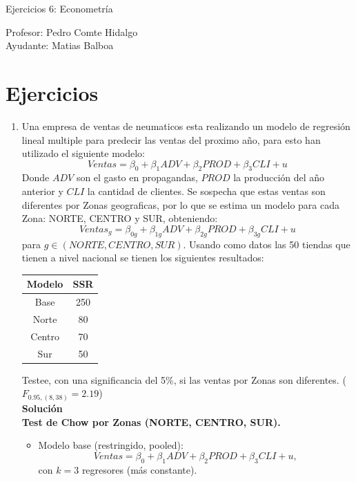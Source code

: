 \documentclass[10pt,a4paper]{article}
\begin{document}
\vspace{5cm}

\begin{center}
    {\Large  Ejercicios 6: Econometría }

Profesor:    Pedro Comte Hidalgo \\
Ayudante: Matias Balboa
\end{center}



\section{Ejercicios}
\begin{enumerate}


\item Una empresa de ventas de neumaticos esta realizando un modelo de regresión lineal multiple para predecir las ventas del proximo año, para esto han utilizado el siguiente modelo:
$$Ventas = \beta_0 + \beta_1ADV + \beta_2PROD+\beta_3CLI + u$$
Donde $ADV$ son el gasto en propagandas, $PROD$ la producción del año anterior y $CLI$ la cantidad de clientes. Se sospecha que estas ventas son diferentes por Zonas geograficas, por lo que se estima un modelo para cada Zona: NORTE, CENTRO y SUR, obteniendo: 
$$Ventas_{g} = \beta_{0g} + \beta_{1g}ADV + \beta_{2g}PROD+\beta_{3g}CLI + u$$
para $g \in {(NORTE,CENTRO,SUR)}$. Usando como datos las 50 tiendas que tienen a nivel nacional se tienen los siguientes resultados:
\begin{center}
    \begin{tabular}{|c|c|}
    \hline
        Modelo & SSR \\
        \hline
        Base & 250 \\
        \hline
        Norte & 80 \\
        \hline
        Centro & 70 \\
        \hline
        Sur & 50 \\
        \hline
    \end{tabular}
\end{center}
Testee, con una significancia del 5\%, si las ventas por Zonas son diferentes. ($F_{0.95,(8,38)}=2.19$)
\\
\textbf{Solución}
\\
\textbf{Test de Chow por Zonas (NORTE, CENTRO, SUR).}

\begin{itemize}
\item Modelo base (restringido, pooled): 
\[
Ventas = \beta_0 + \beta_1 ADV + \beta_2 PROD + \beta_3 CLI + u,
\]
con $k=3$ regresores (más constante).


\end{itemize}
\end{enumerate}
\end{document}
